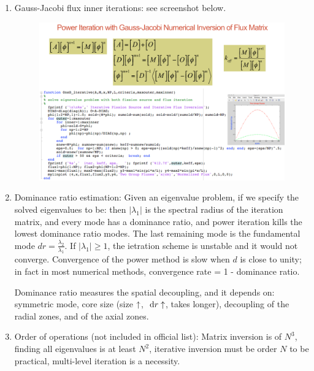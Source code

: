 \documentclass{school-22.211-notes}
\begin{document}
\begin{enumerate}
\begin{enumerate}
\item Gauss-Jacobi flux inner iterations: see screenshot below.
\begin{figure}[ht]
  \centering
  \includegraphics[width=5in]{images/dfs/power-iteration-Gauss-Jacobi.png}
\end{figure}

\item Dominance ratio estimation: 
Given an eigenvalue problem, if we specify the solved eigenvalues to be:
then $|\lambda_1|$ is the spectral radius of the iteration matrix, and every mode has a dominance ratio,
and power iteration kills the lowest dominance ratio modes. The last remaining mode is the fundamental mode $dr = \frac{\lambda_2}{\lambda_1}$. If $|\lambda_1| \ge 1$, the ietration scheme is unstable and it would not converge. Convergence of the power method is slow when $d$ is close to unity; in fact in most numerical methods, convergence rate = 1 - dominance ratio.

Dominance ratio measures the spatial decoupling, and it depends on: symmetric mode, core size (size $\uparrow$, $\mbox{ }\mathrm{d} r \uparrow$, takes longer), decoupling of the radial zones, and of the axial zones. 

\item Order of operations (not included in official list): Matrix inversion is of $N^3$, finding all eigenvalues is at least $N^2$, iterative inversion must be order $N$ to be practical, multi-level iteration is a necessity. 
\end{enumerate}





\end{enumerate}
\end{document}
